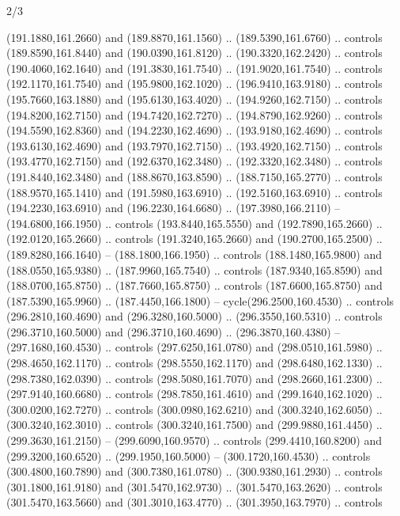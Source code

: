 \begin{flagdescription}{2/3}
\begin{scope}[xshift=0.5\flaglength,yshift=0.5\flagwidth,scale=\flagwidth/259.2]
\begin{scope}[y=0.8pt, x=0.8pt, yscale=-1,shift={(-243,-162)}]
      (191.1880,161.2660) and (189.8870,161.1560) .. (189.5390,161.6760) .. controls
      (189.8590,161.8440) and (190.0390,161.8120) .. (190.3320,162.2420) .. controls
      (190.4060,162.1640) and (191.3830,161.7540) .. (191.9020,161.7540) .. controls
      (192.1170,161.7540) and (195.9800,162.1020) .. (196.9410,163.9180) .. controls
      (195.7660,163.1880) and (195.6130,163.4020) .. (194.9260,162.7150) .. controls
      (194.8200,162.7150) and (194.7420,162.7270) .. (194.8790,162.9260) .. controls
      (194.5590,162.8360) and (194.2230,162.4690) .. (193.9180,162.4690) .. controls
      (193.6130,162.4690) and (193.7970,162.7150) .. (193.4920,162.7150) .. controls
      (193.4770,162.7150) and (192.6370,162.3480) .. (192.3320,162.3480) .. controls
      (191.8440,162.3480) and (188.8670,163.8590) .. (188.7150,165.2770) .. controls
      (188.9570,165.1410) and (191.5980,163.6910) .. (192.5160,163.6910) .. controls
      (194.2230,163.6910) and (196.2230,164.6680) .. (197.3980,166.2110) --
      (194.6800,166.1950) .. controls (193.8440,165.5550) and (192.7890,165.2660) ..
      (192.0120,165.2660) .. controls (191.3240,165.2660) and (190.2700,165.2500) ..
      (189.8280,166.1640) -- (188.1800,166.1950) .. controls (188.1480,165.9800) and
      (188.0550,165.9380) .. (187.9960,165.7540) .. controls (187.9340,165.8590) and
      (188.0700,165.8750) .. (187.7660,165.8750) .. controls (187.6600,165.8750) and
      (187.5390,165.9960) .. (187.4450,166.1800) -- cycle(296.2500,160.4530) ..
      controls (296.2810,160.4690) and (296.3280,160.5000) .. (296.3550,160.5310) ..
      controls (296.3710,160.5000) and (296.3710,160.4690) .. (296.3870,160.4380) --
      (297.1680,160.4530) .. controls (297.6250,161.0780) and (298.0510,161.5980) ..
      (298.4650,162.1170) .. controls (298.5550,162.1170) and (298.6480,162.1330) ..
      (298.7380,162.0390) .. controls (298.5080,161.7070) and (298.2660,161.2300) ..
      (297.9140,160.6680) .. controls (298.7850,161.4610) and (299.1640,162.1020) ..
      (300.0200,162.7270) .. controls (300.0980,162.6210) and (300.3240,162.6050) ..
      (300.3240,162.3010) .. controls (300.3240,161.7500) and (299.9880,161.4450) ..
      (299.3630,161.2150) -- (299.6090,160.9570) .. controls (299.4410,160.8200) and
      (299.3200,160.6520) .. (299.1950,160.5000) -- (300.1720,160.4530) .. controls
      (300.4800,160.7890) and (300.7380,161.0780) .. (300.9380,161.2930) .. controls
      (301.1800,161.9180) and (301.5470,162.9730) .. (301.5470,163.2620) .. controls
      (301.5470,163.5660) and (301.3010,163.4770) .. (301.3950,163.7970) .. controls

\end{scope}
\end{scope}
\end{flagdescription}
